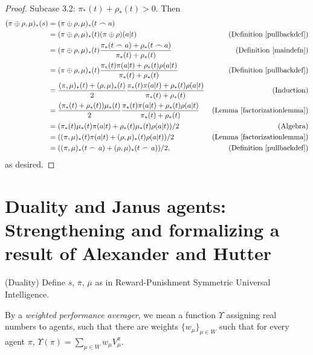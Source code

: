 \documentclass[runningheads]{llncs}
\begin{document}
\begin{proof}
    Subcase 3.2: $\pi_*(t)+\rho_*(t)>0$. Then
    \begin{align*}
        (\pi\oplus\rho,\mu)_*(s) &= (\pi\oplus\rho,\mu)_*(t\frown a)\\
            &= (\pi\oplus\rho,\mu)_*(t)(\pi\oplus\rho)(a|t)
                &\mbox{(Definition \ref{pullbackdef})}\\
            &= (\pi\oplus\rho,\mu)_*(t)\frac{\pi_*(t\frown a)+\rho_*(t\frown a)}
                {\pi_*(t)+\rho_*(t)}
                &\mbox{(Definition \ref{maindefn})}\\
            &= (\pi\oplus\rho,\mu)_*(t)\frac{\pi_*(t)\pi(a|t)+\rho_*(t)\rho(a|t)}
                {\pi_*(t)+\rho_*(t)}
                &\mbox{(Definition \ref{pullbackdef})}\\
            &= \frac{(\pi,\mu)_*(t)+(\rho,\mu)_*(t)}2
                \frac{\pi_*(t)\pi(a|t)+\rho_*(t)\rho(a|t)}{\pi_*(t)+\rho_*(t)}
                &\mbox{(Induction)}\\
            &= \frac{(\pi_*(t)+\rho_*(t))\mu_*(t)}2
                \frac{\pi_*(t)\pi(a|t)+\rho_*(t)\rho(a|t)}{\pi_*(t)+\rho_*(t)}
                &\mbox{(Lemma \ref{factorizationlemma})}\\
            &= (\pi_*(t)\mu_*(t)\pi(a|t) + \rho_*(t)\mu_*(t)\rho(a|t))/2
                &\mbox{(Algebra)}\\
            &= ((\pi,\mu)_*(t)\pi(a|t) + (\rho,\mu)_*(t)\rho(a|t))/2
                &\mbox{(Lemma \ref{factorizationlemma})}\\
            &= ((\pi,\mu)_*(t\frown a) + (\rho,\mu)_*(t\frown a))/2,
                &\mbox{(Definition \ref{pullbackdef})}
    \end{align*}
    as desired.
\end{proof}

\section{Duality and Janus agents:
Strengthening and formalizing a result of Alexander and Hutter}

\begin{definition}
    (Duality) Define $\overline s$, $\overline \pi$, $\overline \mu$
    as in Reward-Punishment Symmetric Universal Intelligence.
\end{definition}

\begin{definition}
    By a \emph{weighted performance averager}, we mean a function
    $\Upsilon$ assigning real numbers to agents, such that there
    are weights $\{w_\mu\}_{\mu\in W}$ such that for every agent
    $\pi$, $\Upsilon(\pi)=\sum_{\mu\in W}w_\mu V^\pi_\mu$.
\end{definition}
\end{document}
